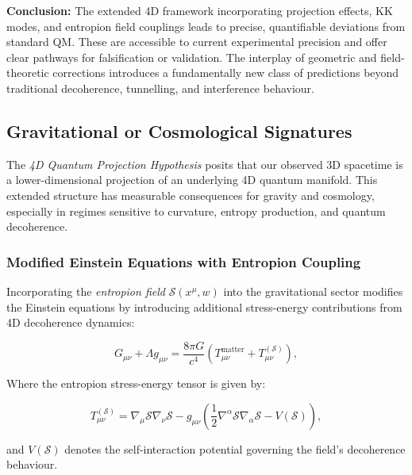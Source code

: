 \documentclass[12pt]{article}
\begin{document}
\vspace{0.5em}
\noindent\textbf{Conclusion:} The extended 4D framework incorporating projection effects, KK modes, and entropion field couplings leads to precise, quantifiable deviations from standard QM. These are accessible to current experimental precision and offer clear pathways for falsification or validation. The interplay of geometric and field-theoretic corrections introduces a fundamentally new class of predictions beyond traditional decoherence, tunnelling, and interference behaviour.

\subsection{Gravitational or Cosmological Signatures}

The \emph{4D Quantum Projection Hypothesis} posits that our observed 3D spacetime is a lower-dimensional projection of an underlying 4D quantum manifold. This extended structure has measurable consequences for gravity and cosmology, especially in regimes sensitive to curvature, entropy production, and quantum decoherence.

\subsubsection*{Modified Einstein Equations with Entropion Coupling}

Incorporating the \emph{entropion field} $\mathcal{S}(x^\mu, w)$ into the gravitational sector modifies the Einstein equations by introducing additional stress-energy contributions from 4D decoherence dynamics:

\begin{equation}
G_{\mu\nu} + \Lambda g_{\mu\nu} = \frac{8\pi G}{c^4} \left( T_{\mu\nu}^{\text{matter}} + T_{\mu\nu}^{(\mathcal{S})} \right),
\label{eq:einstein_modified}
\end{equation}

Where the entropion stress-energy tensor is given by:

\begin{equation}
T_{\mu\nu}^{(\mathcal{S})} = \nabla_\mu \mathcal{S} \nabla_\nu \mathcal{S} - g_{\mu\nu} \left( \frac{1}{2} \nabla^\alpha \mathcal{S} \nabla_\alpha \mathcal{S} - V(\mathcal{S}) \right),
\label{eq:entropion_tensor}
\end{equation}

and $V(\mathcal{S})$ denotes the self-interaction potential governing the field's decoherence behaviour.
\end{document}
